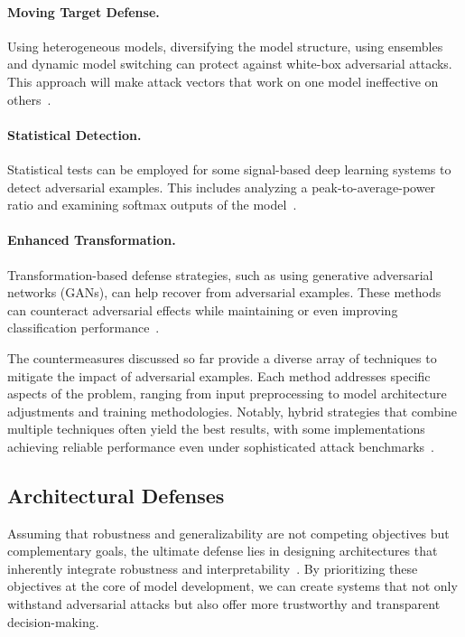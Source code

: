\documentclass[a4paper, oneside]{discothesis}
\begin{document}
\paragraph{Moving Target Defense.} Using heterogeneous models, diversifying the model structure, using ensembles and dynamic model switching can protect against white-box adversarial attacks. This approach will make attack vectors that work on one model ineffective on others~\cite{Li2023wAdvMTDAM}.

\paragraph{Statistical Detection.} Statistical tests can be employed for some signal-based deep learning systems to detect adversarial examples. This includes analyzing a peak-to-average-power ratio and examining softmax outputs of the model~\cite{KokaljFilipovic2019AdversarialEI}.

\paragraph{Enhanced Transformation.} Transformation-based defense strategies, such as using generative adversarial networks (GANs), can help recover from adversarial examples. These methods can counteract adversarial effects while maintaining or even improving classification performance~\cite{Zhao2023EITGANAT}.

The countermeasures discussed so far provide a diverse array of techniques to mitigate the impact of adversarial examples. Each method addresses specific aspects of the problem, ranging from input preprocessing to model architecture adjustments and training methodologies. Notably, hybrid strategies that combine multiple techniques often yield the best results, with some implementations achieving reliable performance even under sophisticated attack benchmarks~\cite{ji2023benchmarking}.

\subsection{Architectural Defenses}

Assuming that robustness and generalizability are not competing objectives but complementary goals, the ultimate defense lies in designing architectures that inherently integrate robustness and interpretability~\cite{rauker2023toward}. By prioritizing these objectives at the core of model development, we can create systems that not only withstand adversarial attacks but also offer more trustworthy and transparent decision-making.
\end{document}
